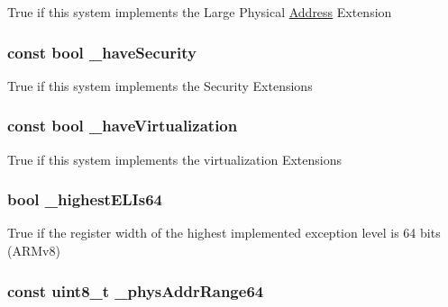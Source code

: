 \label{classArmSystem_a1215984ae18da163f0042f3e1fc64403}
True if this system implements the Large Physical \hyperlink{classAddress}{Address} Extension \hypertarget{classArmSystem_afc4f86a45efbe233466dde9b89cf3fd5}{
\subsubsection[{\_\-haveSecurity}]{\setlength{\rightskip}{0pt plus 5cm}const bool {\bf \_\-haveSecurity}}}
\label{classArmSystem_afc4f86a45efbe233466dde9b89cf3fd5}
True if this system implements the Security Extensions \hypertarget{classArmSystem_a24146119795922982380e6b02b898a37}{
\subsubsection[{\_\-haveVirtualization}]{\setlength{\rightskip}{0pt plus 5cm}const bool {\bf \_\-haveVirtualization}}}
\label{classArmSystem_a24146119795922982380e6b02b898a37}
True if this system implements the virtualization Extensions \hypertarget{classArmSystem_a34da8e2d4b4cf578fc6f605d89aec207}{
\subsubsection[{\_\-highestELIs64}]{\setlength{\rightskip}{0pt plus 5cm}bool {\bf \_\-highestELIs64}}}
\label{classArmSystem_a34da8e2d4b4cf578fc6f605d89aec207}
True if the register width of the highest implemented exception level is 64 bits (ARMv8) \hypertarget{classArmSystem_aca8ae8dd2646e41f8b1e1db3bf8153e3}{
\subsubsection[{\_\-physAddrRange64}]{\setlength{\rightskip}{0pt plus 5cm}const uint8\_\-t {\bf \_\-physAddrRange64}}}
